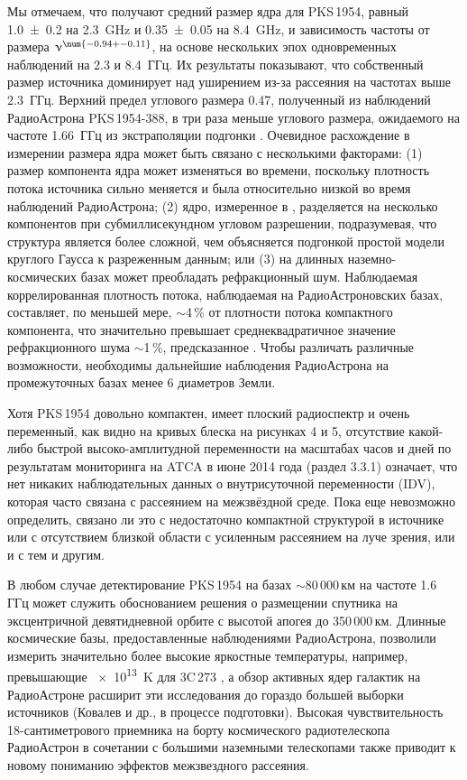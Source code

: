 Мы отмечаем, что \cite{Pushkarev_Kovalev_2015} получают средний размер ядра для
PKS\,1954, равный \SI{1.0+-0.2}{\mas} на \SI{2.3}{\GHz} и \SI{0.35+-0.05}{\mas} на
\SI{8.4}{\GHz}, и зависимость частоты от размера $\nu^{\num{-0.94+-0.11}}$, на основе нескольких
эпох одновременных наблюдений на 2.3 и 8.4~ГГц. Их результаты показывают, что собственный размер
источника доминирует над уширением из-за рассеяния на частотах выше 2.3~ГГц. Верхний предел углового
размера \SI{0.47}{\mas}, полученный из наблюдений РадиоАстрона PKS\,1954-388, в три раза меньше
углового размера, ожидаемого на частоте 1.66~ГГц из экстраполяции подгонки
\cite{Pushkarev_Kovalev_2015}. Очевидное расхождение в измерении размера ядра может быть связано с
несколькими факторами: (1) размер компонента ядра может изменяться во времени, поскольку плотность
потока источника сильно меняется и была относительно низкой во время наблюдений РадиоАстрона; (2)
ядро, измеренное в \cite{Pushkarev_Kovalev_2015}, разделяется на несколько компонентов при
субмиллисекундном угловом разрешении, подразумевая, что структура является более сложной, чем
объясняется подгонкой простой модели круглого Гаусса к разреженным данным; или (3) на длинных
наземно-космических базах может преобладать рефракционный шум. Наблюдаемая коррелированная плотность
потока, наблюдаемая на РадиоАстроновских базах, составляет, по меньшей мере, $\sim$4\,\% от
плотности потока компактного компонента, что значительно превышает среднеквадратичное значение
рефракционного шума $\sim$1\,\%, предсказанное \cite{Johnson_2015}. Чтобы различать различные
возможности, необходимы дальнейшие наблюдения РадиоАстрона на промежуточных базах менее 6 диаметров
Земли.

Хотя PKS\,1954 довольно компактен, имеет плоский радиоспектр и очень переменный, как
видно на кривых блеска на рисунках 4 и 5, отсутствие какой-либо быстрой высоко-амплитудной
переменности на масштабах часов и дней по результатам мониторинга на ATCA в июне 2014 года (раздел
3.3.1) означает, что нет никаких наблюдательных данных о внутрисуточной переменности (IDV), которая
часто связана с рассеянием на межзвёздной среде. Пока еще невозможно определить, связано ли это с
недостаточно компактной структурой в источнике или с отсутствием близкой области с усиленным
рассеянием на луче зрения, или и с тем и другим.

В любом случае детектирование PKS\,1954 на базах $\sim$80\,000\,км на частоте 1.6
ГГц может служить обоснованием решения о размещении спутника на эксцентричной девятидневной орбите
с высотой апогея до 350\,000\,км. Длинные космические базы, предоставленные наблюдениями
РадиоАстрона, позволили измерить значительно более высокие яркостные температуры, например,
превышающие \SI{e13}{\kelvin} для 3C\,273 \cite{Kovalev_2016}, а обзор активных ядер
галактик на РадиоАстроне расширит эти исследования до гораздо большей выборки источников
(Ковалев и др., в процессе подготовки). Высокая чувствительность 18-сантиметрового приемника на
борту космического радиотелескопа РадиоАстрон в сочетании с большими наземными телескопами также
приводит к новому пониманию эффектов межзвездного рассеяния.

